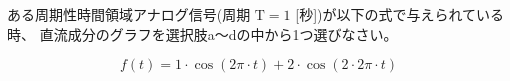 ある周期性時間領域アナログ信号(周期 $\textrm{T} = 1$ [秒])が以下の式で与えられている時、
直流成分のグラフを選択肢a〜dの中から1つ選びなさい。

\[
f(t) = 
1 \cdot \cos( 2 \pi \cdot t )
+2 \cdot \cos( 2 \cdot 2 \pi \cdot t )
\]
